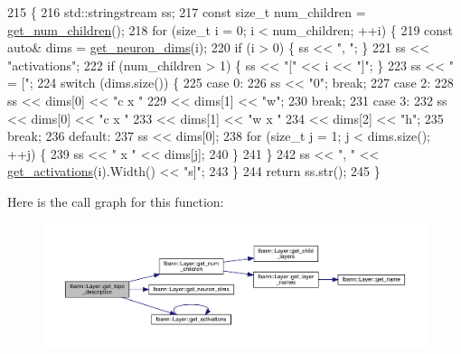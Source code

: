\begin{DoxyCode}
215                                             \{
216   std::stringstream ss;
217   \textcolor{keyword}{const} \textcolor{keywordtype}{size\_t} num\_children = \hyperlink{classlbann_1_1Layer_a1409a117c31a7ea4f2c7a4d22a3e86c3}{get\_num\_children}();
218   \textcolor{keywordflow}{for} (\textcolor{keywordtype}{size\_t} i = 0; i < num\_children; ++i) \{
219     \textcolor{keyword}{const} \textcolor{keyword}{auto}& dims = \hyperlink{classlbann_1_1Layer_a54f53393fadbfdc73b4e72489c868433}{get\_neuron\_dims}(i);
220     \textcolor{keywordflow}{if} (i > 0) \{ ss << \textcolor{stringliteral}{", "}; \}
221     ss << \textcolor{stringliteral}{"activations"};
222     \textcolor{keywordflow}{if} (num\_children > 1) \{ ss << \textcolor{stringliteral}{"["} << i << \textcolor{stringliteral}{"]"}; \}
223     ss << \textcolor{stringliteral}{" = ["};
224     \textcolor{keywordflow}{switch} (dims.size()) \{
225     \textcolor{keywordflow}{case} 0:
226       ss << \textcolor{stringliteral}{"0"}; \textcolor{keywordflow}{break};
227     \textcolor{keywordflow}{case} 2:
228       ss << dims[0] << \textcolor{stringliteral}{"c x "}
229          << dims[1] << \textcolor{stringliteral}{"w"};
230       \textcolor{keywordflow}{break};
231     \textcolor{keywordflow}{case} 3:
232       ss << dims[0] << \textcolor{stringliteral}{"c x "}
233          << dims[1] << \textcolor{stringliteral}{"w x "}
234          << dims[2] << \textcolor{stringliteral}{"h"};
235       \textcolor{keywordflow}{break};
236     \textcolor{keywordflow}{default}:
237       ss << dims[0];
238       \textcolor{keywordflow}{for} (\textcolor{keywordtype}{size\_t} j = 1; j < dims.size(); ++j) \{
239         ss << \textcolor{stringliteral}{" x "} << dims[j];
240       \}
241     \}
242     ss << \textcolor{stringliteral}{", "} << \hyperlink{classlbann_1_1Layer_a1134b1a4385af199d7272c5aa827fa99}{get\_activations}(i).Width() << \textcolor{stringliteral}{"s]"};
243   \}
244   \textcolor{keywordflow}{return} ss.str();
245 \}
\end{DoxyCode}
Here is the call graph for this function\+:\nopagebreak
\begin{figure}[H]
\begin{center}
\leavevmode
\includegraphics[width=350pt]{classlbann_1_1Layer_a147a7f7dcf0027a60f10109439e5dcea_cgraph}
\end{center}
\end{figure}

